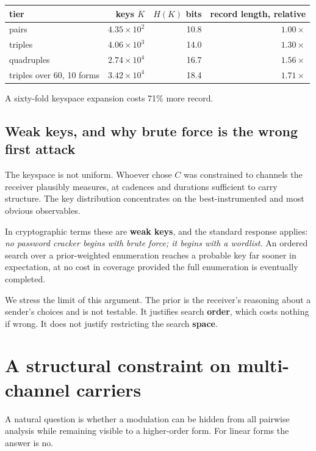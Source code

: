 \begin{center}
\begin{tabular}{@{}lrrr@{}}
\toprule
tier & keys $K$ & $H(K)$ bits & record length, relative \\
\midrule
pairs                      & $4.35\times10^{2}$ & 10.8 & $1.00\times$ \\
triples                    & $4.06\times10^{3}$ & 14.0 & $1.30\times$ \\
quadruples                 & $2.74\times10^{4}$ & 16.7 & $1.56\times$ \\
triples over 60, 10 forms  & $3.42\times10^{4}$ & 18.4 & $1.71\times$ \\
\bottomrule
\end{tabular}
\end{center}

A sixty-fold keyspace expansion costs 71\% more record.

\subsection{Weak keys, and why brute force is the wrong first attack}\label{sec:weak}

The keyspace is not uniform. Whoever chose $C$ was constrained to channels the
receiver plausibly measures, at cadences and durations sufficient to carry
structure. The key distribution concentrates on the best-instrumented and most
obvious observables.

In cryptographic terms these are \textbf{weak keys}, and the standard response
applies: \emph{no password cracker begins with brute force; it begins with a
wordlist.} An ordered search over a prior-weighted enumeration reaches a probable
key far sooner in expectation, at no cost in coverage provided the full
enumeration is eventually completed.

We stress the limit of this argument. The prior is the receiver's reasoning about
a sender's choices and is not testable. It justifies search \textbf{order}, which
costs nothing if wrong. It does not justify restricting the search
\textbf{space}.

\section{A structural constraint on multi-channel carriers}\label{sec:theorem}

A natural question is whether a modulation can be hidden from all pairwise
analysis while remaining visible to a higher-order form. For linear forms the
answer is no.

